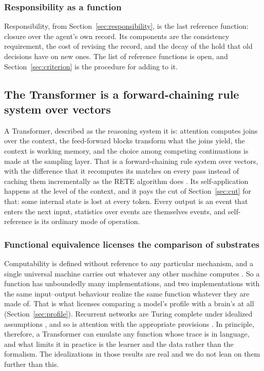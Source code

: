 \subsubsection{Responsibility as a function}

Responsibility, from Section~\ref{sec:responsibility}, is the last reference function: closure over the
agent's own record. Its components are the consistency requirement, the cost of revising the record, and
the decay of the hold that old decisions have on new ones. The list of reference functions is open, and
Section~\ref{sec:criterion} is the procedure for adding to it.

\subsection{The Transformer is a forward-chaining rule system over vectors}
\label{sec:transformer}

A Transformer, described as the reasoning system it is: attention computes joins over the context, the
feed-forward blocks transform what the joins yield, the context is working memory, and the choice among
competing continuations is made at the sampling layer. That is a forward-chaining rule system over
vectors, with the difference that it recomputes its matches on every pass instead of caching them
incrementally as the RETE algorithm does \citep{forgy1982}. Its self-application happens at the level of
the context, and it pays the cut of Section~\ref{sec:cut} for that: some internal state is lost at every
token. Every output is an event that enters the next input, statistics over events are themselves
events, and self-reference is its ordinary mode of operation.

\subsubsection{Functional equivalence licenses the comparison of substrates}

Computability is defined without reference to any particular mechanism, and a single universal machine
carries out whatever any other machine computes \citep[\S 6--7]{turing1936}. So a function has
unboundedly many implementations, and two implementations with the same input--output behaviour realize
the same function whatever they are made of. That is what
licenses comparing a model's profile with a brain's at all (Section~\ref{sec:profile}). Recurrent
networks are Turing complete under idealized assumptions \citep{siegelmann1995}, and so is attention
with the appropriate provisions \citep{perez2021}. In principle, therefore, a Transformer can emulate
any function whose trace is in language, and what limits it in practice is the learner and the data
rather than the formalism. The idealizations in those results are real and we do not lean on them
further than this.

